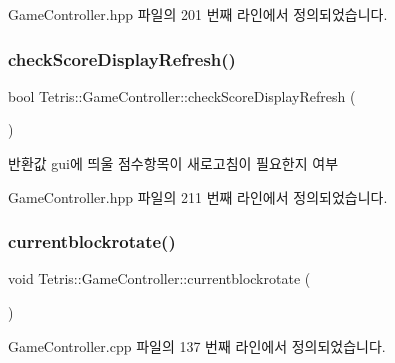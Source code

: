 Game\+Controller.\+hpp 파일의 201 번째 라인에서 정의되었습니다.

\mbox{\label{class_tetris_1_1_game_controller_a626e0107413258a25179813653066776}} 
\subsubsection{\texorpdfstring{check\+Score\+Display\+Refresh()}{checkScoreDisplayRefresh()}}
{\footnotesize\ttfamily bool Tetris\+::\+Game\+Controller\+::check\+Score\+Display\+Refresh (\begin{DoxyParamCaption}{ }\end{DoxyParamCaption})\hspace{0.3cm}{\ttfamily [inline]}}

\begin{DoxyReturn}{반환값}
gui에 띄울 \textquotesingle{}점수\textquotesingle{}항목이 새로고침이 필요한지 여부 
\end{DoxyReturn}


Game\+Controller.\+hpp 파일의 211 번째 라인에서 정의되었습니다.

\mbox{\label{class_tetris_1_1_game_controller_a5d93facb945f87ba33fb8be74df023fa}} 
\subsubsection{\texorpdfstring{currentblockrotate()}{currentblockrotate()}\hspace{0.1cm}{\footnotesize\ttfamily [1/2]}}
{\footnotesize\ttfamily void Tetris\+::\+Game\+Controller\+::currentblockrotate (\begin{DoxyParamCaption}{ }\end{DoxyParamCaption})}



Game\+Controller.\+cpp 파일의 137 번째 라인에서 정의되었습니다.

